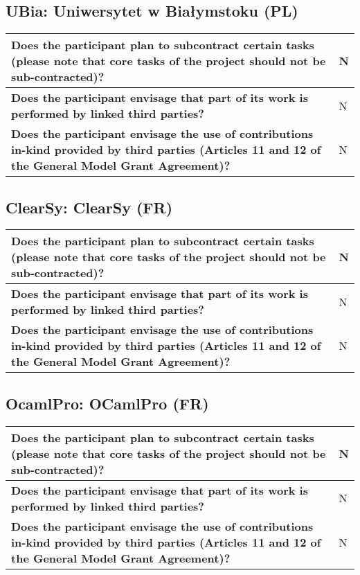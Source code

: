 \subsection*{UBia: Uniwersytet w Białymstoku (PL)}

\begin{longtable*}{|p{0.75\textwidth}|p{0.2\textwidth}|}
\hline
{\bf Does the participant plan to subcontract certain tasks (please
  note that core tasks of the project should not be sub-contracted)?}
&
N
\\
\hline
{\bf Does the participant envisage that  part of its work is performed
  by linked third parties?}
&
N
\\
\hline
{\bf Does the participant envisage the use of contributions in-kind
provided by third parties (Articles 11 and 12 of the General Model
Grant Agreement)?}
&
N
\\
\hline
\end{longtable*}


\subsection*{ClearSy: ClearSy (FR)}

\begin{longtable*}{|p{0.75\textwidth}|p{0.2\textwidth}|}
\hline
{\bf Does the participant plan to subcontract certain tasks (please
  note that core tasks of the project should not be sub-contracted)?}
&
N
\\
\hline
{\bf Does the participant envisage that  part of its work is performed
  by linked third parties?}
&
N
\\
\hline
{\bf Does the participant envisage the use of contributions in-kind
provided by third parties (Articles 11 and 12 of the General Model
Grant Agreement)?}
&
N
\\
\hline
\end{longtable*}


\subsection*{OcamlPro: OCamlPro (FR)}

\begin{longtable*}{|p{0.75\textwidth}|p{0.2\textwidth}|}
\hline
{\bf Does the participant plan to subcontract certain tasks (please
  note that core tasks of the project should not be sub-contracted)?}
&
N
\\
\hline
{\bf Does the participant envisage that  part of its work is performed
  by linked third parties?}
&
N
\\
\hline
{\bf Does the participant envisage the use of contributions in-kind
provided by third parties (Articles 11 and 12 of the General Model
Grant Agreement)?}
&
N
\\
\hline
\end{longtable*}


